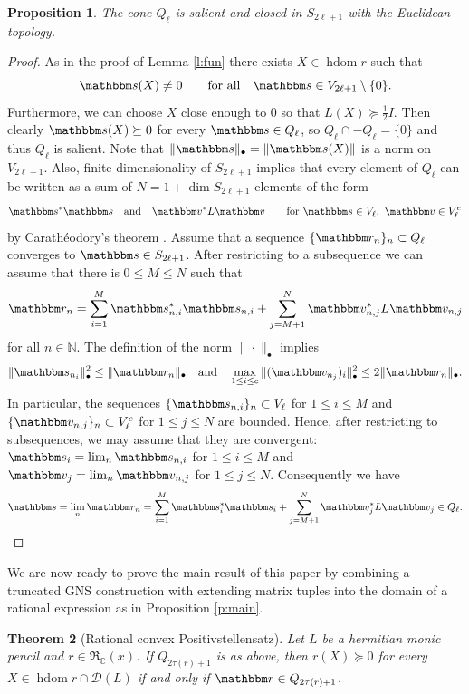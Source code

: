\documentclass[12pt,a4paper]{amsart}
\DeclareMathOperator{\hdom}{hdom}
\newcommand{\N}{\mathbb{N}}
\newcommand{\C}{\mathbb{C}}
\newcommand{\cD}{\mathcal{D}}
\newcommand{\rr}{\mathbbm r}
\newcommand{\rs}{\mathbbm s}
\newcommand{\rv}{\mathbbm v}
\newcommand{\hV}{S}
\newcommand{\rex}{\mathfrak{R}_{\C}(x)}
\newtheorem{thm}{Theorem}[section]
\newtheorem{prop}[thm]{Proposition}
\theoremstyle{definition}
\theoremstyle{remark}
\numberwithin{equation}{section}
\begin{document}
\begin{prop}\label{p:closed}
The cone $Q_\ell$ is salient and closed in $\hV_{2\ell+1}$ with the Euclidean topology.
\end{prop}

\begin{proof}
As in the proof of Lemma \ref{l:fun} there exists $X\in\hdom r$ such that
$$\rs(X)\neq0 \qquad \text{for all}\quad \rs\in V_{2\ell+1}\setminus\{0\}.$$
Furthermore, we can choose $X$ close enough to 0 so that $L(X)\succeq \frac12 I$. Then clearly $\rs(X)\succeq0$ for every $\rs\in Q_\ell$, so $Q_\ell\cap-Q_\ell=\{0\}$ and thus $Q_\ell$ is salient. Note that $\|\rs\|_{\bullet}= \|\rs(X)\|$ is a norm on $V_{2\ell+1}$. Also, finite-dimensionality of $\hV_{2\ell+1}$ implies that every element of $Q_\ell$ can be written as a sum of $N=1+\dim\hV_{2\ell+1}$ elements of the form
$$\rs^*\rs\quad \text{and}\quad \rv^* L\rv 
\qquad \text{for}\ \rs\in V_\ell,\ \rv\in V_\ell^e$$
by Carath\'eodory's theorem \cite[Theorem I.2.3]{Bar}. Assume that a sequence $\{\rr_n\}_n\subset Q_\ell$ converges to $\rs\in \hV_{2\ell+1}$. After restricting to a subsequence we can assume that there is $0\le M\le N$ such that
$$\rr_n=\sum_{i=1}^M \rs_{n,i}^*\rs_{n,i}+\sum_{j=M+1}^N \rv_{n,j}^* L\rv_{n,j}$$
for all $n\in\N$. The definition of the norm $\|\cdot\|_\bullet$ implies
$$\|\rs_{n_i}\|_\bullet^2\le \|\rr_n\|_\bullet
\quad \text{and} \quad
\max_{1\le i\le e}\|(\rv_{n_j})_i\|_\bullet^2\le 2\|\rr_n\|_\bullet.$$
In particular, the sequences $\{\rs_{n,i}\}_n\subset V_\ell$ for $1\le i\le M$ and $\{\rv_{n,j}\}_n\subset V_\ell^e$ for $1\le j\le N$ are bounded. Hence, after restricting to subsequences, we may assume that they are convergent: $\rs_i=\lim_n\rs_{n,i}$ for $1\le i\le M$ and $\rv_j=\lim_n\rv_{n,j}$ for $1\le j\le N$. Consequently we have
\[\rs=\lim_n\rr_n=
\sum_{i=1}^M \rs_i^*\rs_i+\sum_{j=M+1}^N \rv_j^* L\rv_j
\in Q_\ell. \qedhere\]
\end{proof}

We are now ready to prove the main result of this paper by combining 
a truncated GNS construction with 
extending matrix tuples into the domain of a rational expression 
as in Proposition \ref{p:main}.

\begin{thm}[Rational convex Positivstellensatz]\label{t:main}
Let $L$ be a hermitian monic pencil and $r\in\rex$. If $Q_{2\tau(r)+1}$ is as above, then $r(X)\succeq0$ for every $X\in\hdom r\cap\cD(L)$ if and only if $\rr\in Q_{2\tau(r)+1}$.
\end{thm}
\end{document}
